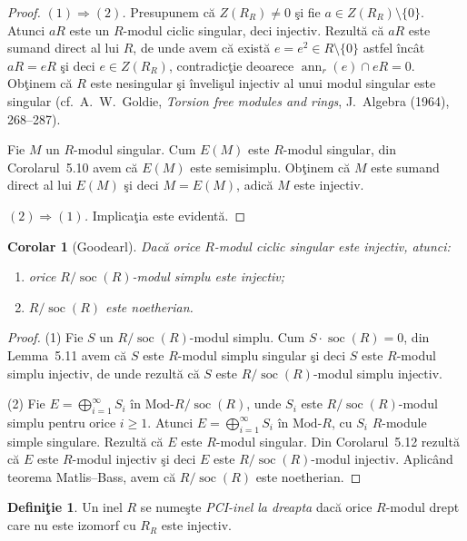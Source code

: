 \documentclass[12pt,a4paper]{book}
\DeclareMathOperator{\soc}{soc}
\DeclareMathOperator{\ann}{ann}
\theoremstyle{plain}
\newtheorem{corollary}[theorem]{Corolar}
\theoremstyle{definition}
\newtheorem{definition}[theorem]{Definiţie}
\theoremstyle{remark}
\begin{document}
\begin{proof}
\emph{\((1) \Rightarrow (2)\).}
Presupunem că \(Z(R_R) \neq 0\) şi fie \(a \in Z(R_R) \setminus \{0\}\).
Atunci \(aR\) este un \(R\)-modul ciclic singular, deci injectiv.
Rezultă că \(aR\) este sumand direct al lui \(R\), de unde avem că există
\(e = e^2 \in R \setminus \{0\}\) astfel încât \(aR = eR\) şi deci
\(e \in Z(R_R)\), contradicţie deoarece \(\ann_r(e) \cap eR = 0\).
Obţinem că \(R\) este nesingular şi învelişul injectiv al unui modul singular
este singular (cf.\ A.~W.~Goldie, \emph{Torsion free modules and rings},
J.~Algebra (1964), 268–287).

Fie \(M\) un \(R\)-modul singular.
Cum \(E(M)\) este \(R\)-modul singular, din Corolarul~5.10 avem că
\(E(M)\) este semisimplu.
Obţinem că \(M\) este sumand direct al lui \(E(M)\) şi deci \(M = E(M)\),
adică \(M\) este injectiv.

\emph{\((2) \Rightarrow (1)\).}
Implicaţia este evidentă.
\end{proof}

\begin{corollary}[Goodearl]\label{cor:5.13-RO}
Dacă orice \(R\)-modul ciclic singular este injectiv, atunci:
\begin{enumerate}
  \item orice \(R / \soc(R)\)-modul simplu este injectiv;
  \item \(R / \soc(R)\) este noetherian.
\end{enumerate}
\end{corollary}

\begin{proof}
(1) Fie \(S\) un \(R / \soc(R)\)-modul simplu.
Cum \(S \cdot \soc(R) = 0\), din Lemma~5.11 avem că \(S\) este
\(R\)-modul simplu singular şi deci \(S\) este \(R\)-modul simplu injectiv,
de unde rezultă că \(S\) este \(R / \soc(R)\)-modul simplu injectiv.

(2) Fie \(E = \bigoplus_{i=1}^{\infty} S_i\) în \(\mathrm{Mod}\text{-}R/\soc(R)\), unde
\(S_i\) este \(R/\soc(R)\)-modul simplu pentru orice \(i \geq 1\).
Atunci \(E = \bigoplus_{i=1}^{\infty} S_i\) în \(\mathrm{Mod}\text{-}R\), cu
\(S_i\) \(R\)-module simple singulare. Rezultă că \(E\) este \(R\)-modul singular.
Din Corolarul~5.12 rezultă că \(E\) este \(R\)-modul injectiv şi deci
\(E\) este \(R/\soc(R)\)-modul injectiv. Aplicând teorema Matlis–Bass,
avem că \(R/\soc(R)\) este noetherian.
\end{proof}

\begin{definition}
Un inel \(R\) se numeşte \emph{PCI-inel la dreapta} dacă orice \(R\)-modul
drept care nu este izomorf cu \(R_R\) este injectiv.
\end{definition}
\end{document}
